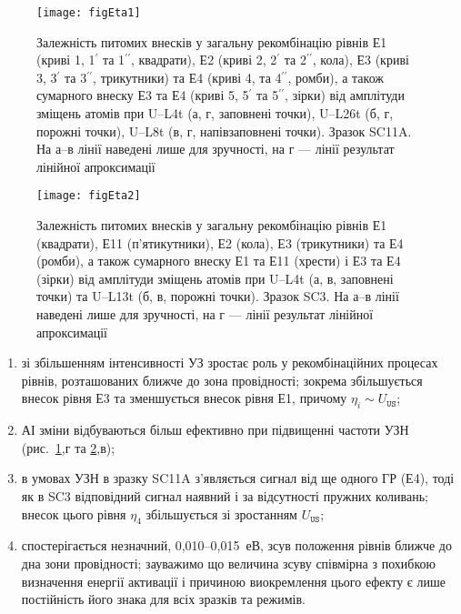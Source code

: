 \begin{figure}
\center
\texttt{[image: figEta1]}
\caption{\label{figEta1}
Залежність питомих внесків у загальну рекомбінацію рівнів
Е1 (криві 1, 1$^{\prime}$ та 1$^{\prime\prime}$, квадрати),
Е2 (криві 2, 2$^{\prime}$ та 2$^{\prime\prime}$, кола),
Е3 (криві 3, 3$^{\prime}$ та 3$^{\prime\prime}$, трикутники)
та Е4 (криві 4, та 4$^{\prime\prime}$, ромби),
а також сумарного внеску
Е3 та Е4 (криві 5, 5$^{\prime}$ та 5$^{\prime\prime}$, зірки)
від амплітуди зміщень атомів
при U--L4t (а, г, заповнені точки),
U--L26t (б, г, порожні точки),
U--L8t (в, г, напівзаповнені точки).
Зразок SC11A.
На а--в лінії наведені лише для зручності,
на г --- лінії результат лінійної апроксимації
}%
\end{figure}

\begin{figure}
\center
\texttt{[image: figEta2]}
\caption{\label{figEta2}
Залежність питомих внесків у загальну рекомбінацію рівнів
Е1 (квадрати),
Е11 (п'ятикутники),
Е2 (кола),
Е3 (трикутники)
та Е4 (ромби),
а також сумарного внеску
Е1 та Е11 (хрести) і
Е3 та Е4 (зірки)
від амплітуди зміщень атомів
при U--L4t (а, в, заповнені точки) та
U--L13t (б, в, порожні точки).
Зразок SC3.
На а--в лінії наведені лише для зручності,
на г --- лінії результат лінійної апроксимації
}%
\end{figure}

\begin{enumerate}[label=\asbuk*),leftmargin=0em,itemindent=1.5em]
\item зі збільшенням інтенсивності УЗ зростає роль у рекомбінаційних процесах рівнів, розташованих ближче до зона провідності; зокрема збільшується внесок рівня Е3 та зменшується внесок рівня Е1, причому
$\eta_i\sim U_\mathtt{US}$;
\item АІ зміни відбуваються більш ефективно при підвищенні частоти УЗН (рис.~\ref{figEta1},г та \ref{figEta2},в);
\item в умовах УЗН в зразку SC11A з'являється сигнал від ще одного ГР (Е4), тоді як в SC3 відповідний сигнал наявний і за відсутності пружних коливань; внесок цього рівня $\eta_4$ збільшується зі зростанням $U_\mathtt{US}$;
\item спостерігається незначний, 0,010--0,015~еВ, зсув положення рівнів ближче до дна зони провідності; зауважимо що величина зсуву співмірна з похибкою визначення енергії активації і причиною виокремлення цього ефекту є лише постійність його знака для всіх зразків та режимів.
\end{enumerate}

